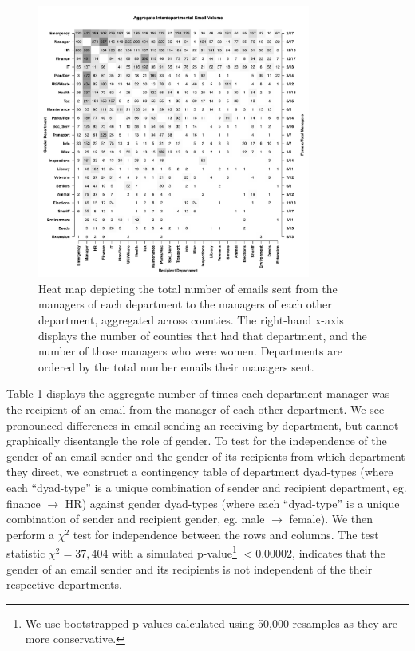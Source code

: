 \documentclass{pnastwo}
\begin{document}
\begin{article}
	\begin{figure}
	\centering
	\includegraphics[width = 0.8\textwidth]{images/Aggregate_Email_Flows.pdf}
	\caption{\label{fig:heatmaps}Heat map depicting the total number of emails sent from the managers of each department to the managers of each other department, aggregated across counties. The right-hand x-axis displays the number of counties that had that department, and the number of those managers who were women. Departments are ordered by the total number emails their managers sent.}
	\end{figure}
	
	
Table \ref{fig:heatmaps} displays the aggregate number of times each department manager was the recipient of an email from the manager of each other department. We see pronounced differences in email sending an receiving by department, but cannot graphically disentangle the role of gender. To test for the independence of the gender of an email sender and the gender of its recipients from which department they direct, we construct a contingency table of department dyad-types (where each ``dyad-type'' is a unique combination of sender and recipient department, eg. finance $\longrightarrow$ HR) against gender dyad-types (where each ``dyad-type'' is a unique combination of sender and recipient gender, eg. male $\longrightarrow$ female).  We then perform a $\chi^2$ test for independence between the rows and columns. The test statistic $\chi^2 = 37,404$ with a simulated p-value\footnote{We use bootstrapped p values calculated using 50,000 resamples as they are more conservative.} $< 0.00002$, indicates that the gender of an email sender and its recipients is not independent of the their respective departments.
	

\end{article}
\end{document}
